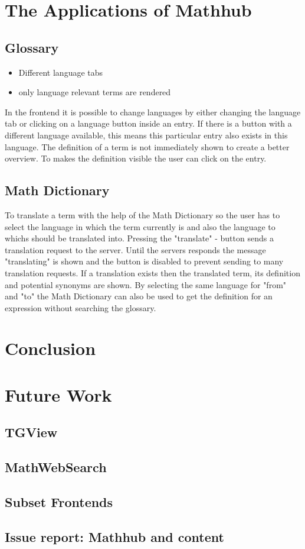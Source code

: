 \documentclass[11pt,a4paper]{article}
\begin{document}
\section{The Applications of Mathhub}
	\subsection{Glossary}
\begin{itemize}
\item Different language tabs
\item only language relevant terms are rendered
\end{itemize}
In the frontend it is possible to change languages by either changing the language tab or clicking on a language button inside an entry. If there is a button with a different language available, this means this particular entry also exists in this language. The definition of a term is not immediately shown to create a better overview. To makes the definition visible the user can click on the entry. 

 	\subsection{Math Dictionary}
To translate a term with the help of the Math Dictionary so the user has to select the language in which the term currently is and also the language to whichs should be translated into. Pressing the "translate" - button sends a translation request to the server. Until the servers responds the message "translating" is shown and the button is disabled to prevent sending to many translation requests. If a translation exists then the translated term, its definition and potential synonyms are shown.
By selecting the same language for "from" and "to" the Math Dictionary can also be used to get the definition for an expression without searching the glossary.

\section{Conclusion}

\section{Future Work}
	\subsection{TGView}
	\subsection{MathWebSearch}
	\subsection{Subset Frontends}
	\subsection{Issue report: Mathhub and content}

\printbibliography
\end{document}
